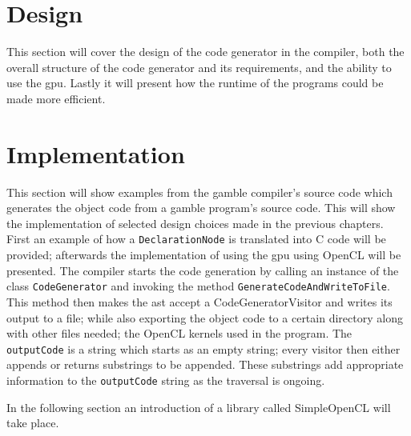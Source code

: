 
\section{Design}
This section will cover the design of the code generator in the compiler, both the overall structure of the code generator and its requirements, and the ability to use the \acrshort{gpu}.
Lastly it will present how the runtime of the programs could be made more efficient.



\section{Implementation}
This section will show examples from the \gls{gamble} compiler's source code which generates the object code from a \gls{gamble} program's source code.
This will show the implementation of selected design choices made in the previous chapters.
First an example of how a \texttt{DeclarationNode} is translated into C code will be provided; afterwards the implementation of using the \acrshort{gpu} using OpenCL will be presented.
The compiler starts the code generation by calling an instance of the class \texttt{CodeGenerator} and invoking the method \texttt{GenerateCodeAndWriteToFile}.
This method then makes the \acrshort{ast} accept a CodeGeneratorVisitor and writes its output to a file; while also exporting the object code to a certain directory along with other files needed; the OpenCL kernels used in the program.
The \texttt{outputCode} is a string which starts as an empty string; every visitor then either appends or returns substrings to be appended.
These substrings add appropriate information to the \texttt{outputCode} string as the traversal is ongoing.



In the following section an introduction of a library called SimpleOpenCL will take place.

